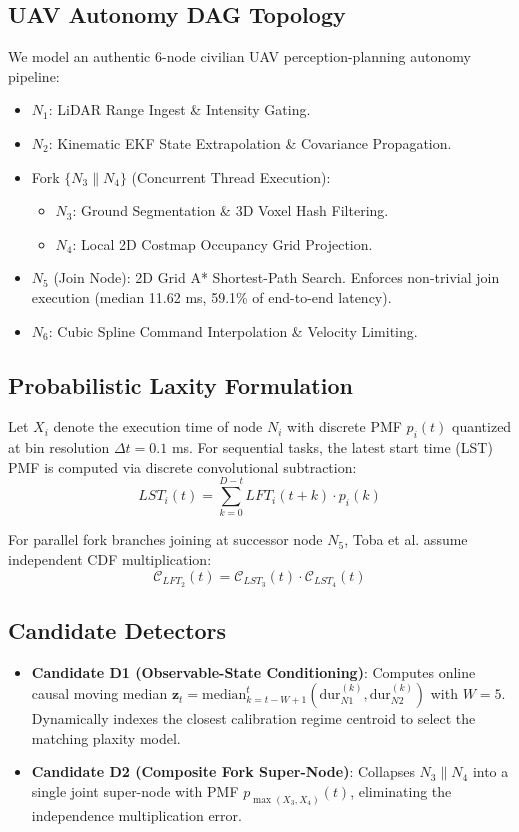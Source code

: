 \documentclass[conference]{IEEEtran}
\begin{document}
\subsection{UAV Autonomy DAG Topology}
We model an authentic 6-node civilian UAV perception-planning autonomy pipeline:
\begin{itemize}
    \item $N_1$: LiDAR Range Ingest \& Intensity Gating.
    \item $N_2$: Kinematic EKF State Extrapolation \& Covariance Propagation.
    \item Fork $\{N_3 \parallel N_4\}$ (Concurrent Thread Execution):
    \begin{itemize}
        \item $N_3$: Ground Segmentation \& 3D Voxel Hash Filtering.
        \item $N_4$: Local 2D Costmap Occupancy Grid Projection.
    \end{itemize}
    \item $N_5$ (Join Node): 2D Grid A* Shortest-Path Search. Enforces non-trivial join execution (median 11.62 ms, 59.1\% of end-to-end latency).
    \item $N_6$: Cubic Spline Command Interpolation \& Velocity Limiting.
\end{itemize}

\subsection{Probabilistic Laxity Formulation}
Let $X_i$ denote the execution time of node $N_i$ with discrete PMF $p_i(t)$ quantized at bin resolution $\Delta t = 0.1$ ms.
For sequential tasks, the latest start time (LST) PMF is computed via discrete convolutional subtraction:
\begin{equation}
LST_{i}(t) = \sum_{k=0}^{D - t} LFT_{i}(t + k) \cdot p_i(k)
\end{equation}

For parallel fork branches joining at successor node $N_5$, Toba et al. assume independent CDF multiplication:
\begin{equation}
\mathcal{C}_{LFT_2}(t) = \mathcal{C}_{LST_3}(t) \cdot \mathcal{C}_{LST_4}(t)
\end{equation}

\subsection{Candidate Detectors}
\begin{itemize}
    \item \textbf{Candidate D1 (Observable-State Conditioning)}: Computes online causal moving median $\mathbf{z}_t = \text{median}_{k=t-W+1}^t (\text{dur}_{N1}^{(k)}, \text{dur}_{N2}^{(k)})$ with $W=5$. Dynamically indexes the closest calibration regime centroid to select the matching plaxity model.
    \item \textbf{Candidate D2 (Composite Fork Super-Node)}: Collapses $N_3 \parallel N_4$ into a single joint super-node with PMF $p_{\max(X_3, X_4)}(t)$, eliminating the independence multiplication error.
\end{itemize}
\end{document}
